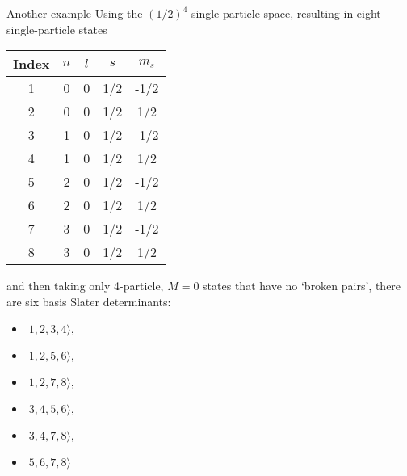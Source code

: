 \documentclass[graybox,sectrefs,envcountresetchap,open=right]{svmonodo}
\begin{document}
Another example
Using the $(1/2)^4$ single-particle space, resulting in eight single-particle states



{\small   %

\vspace{4mm}

\begin{tabular}{ccccc}
\hline
\multicolumn{1}{c}{ Index } & \multicolumn{1}{c}{ $n$ } & \multicolumn{1}{c}{ $l$ } & \multicolumn{1}{c}{ $s$ } & \multicolumn{1}{c}{ $m_s$ } \\
\hline
1     & 0   & 0   & 1/2 & -1/2  \\
2     & 0   & 0   & 1/2 & 1/2   \\
3     & 1   & 0   & 1/2 & -1/2  \\
4     & 1   & 0   & 1/2 & 1/2   \\
5     & 2   & 0   & 1/2 & -1/2  \\
6     & 2   & 0   & 1/2 & 1/2   \\
7     & 3   & 0   & 1/2 & -1/2  \\
8     & 3   & 0   & 1/2 & 1/2   \\
\hline
\end{tabular}

\vspace{4mm}

}


\noindent
and then taking only 4-particle, $M=0$ states that have no `broken pairs', there are six basis Slater 
determinants:

\begin{itemize}
\item $|           1,           2 ,          3         ,       4  \rangle , $

\item $|            1      ,     2        ,        5         ,       6 \rangle , $

\item $|            1         ,       2     ,           7         ,       8  \rangle , $

\item $|            3        ,        4      ,          5          ,      6  \rangle , $

\item $|            3        ,        4      ,          7         ,       8  \rangle , $

\item $|            5        ,        6     ,           7     ,           8  \rangle $
\end{itemize}
\end{document}
